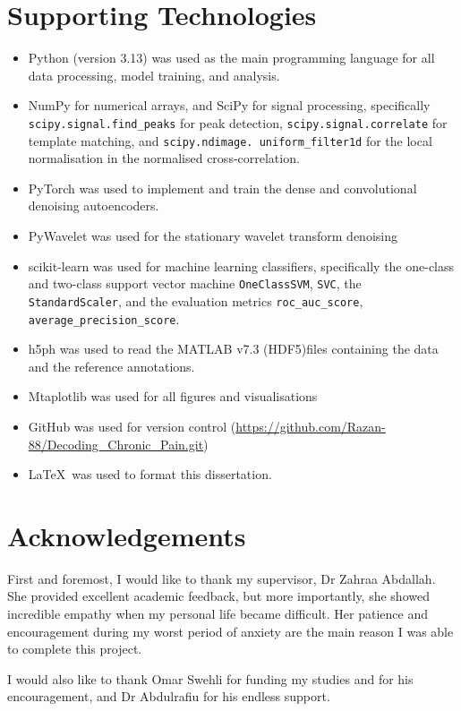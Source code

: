 \documentclass[ %
                    author={Rzan Alkabier},
                    supervisor={Dr. Zahraa Abdallah},
                    degree={MSc},
                     title={Denoising Extracellular Recording for Spike Detection and Classification on Single Channels},
                    subtitle={Does denoising improve detection and classification performance?},
                      type={},
                      year={2026}]{dissertation}
\begin{document}
\chapter*{Supporting Technologies}
\begin{itemize}
    \item Python (version 3.13) was used as the main programming language for all data processing, model training, and analysis. 
    \item NumPy for numerical arrays, and SciPy for signal processing, specifically \texttt{scipy.signal.find\_peaks} for peak detection, \texttt{scipy.signal.correlate} for template matching, and \texttt{scipy.ndimage. uniform\_filter1d} for the local normalisation in the normalised cross-correlation. 
    \item PyTorch was used to implement and train the dense and convolutional denoising autoencoders. 
    \item PyWavelet was used for the stationary wavelet transform denoising
    \item scikit-learn was used for machine learning classifiers, specifically the one-class and two-class support vector machine \texttt{OneClassSVM}, \texttt{SVC}, the \texttt{StandardScaler}, and the evaluation metrics \texttt{roc\_auc\_score}, \texttt{average\_precision\_score}. 
    \item h5ph was used to read the MATLAB v7.3 (HDF5)files containing the data and the reference annotations. 
    \item Mtaplotlib was used for all figures and visualisations
    \item GitHub was used for version control (\url{https://github.com/Razan-88/Decoding_Chronic_Pain.git})
    \item \LaTeX\ was used to format this dissertation.  
    
\end{itemize}
\chapter*{Acknowledgements}
First and foremost, I would like to thank my supervisor, Dr Zahraa Abdallah. She provided excellent academic feedback, but more importantly, she showed incredible empathy when my personal life became difficult. Her patience and encouragement during my worst period of anxiety are the main reason I was able to complete this project. 

\noindent
I would also like to thank Omar Swehli for funding my studies and for his encouragement, and Dr Abdulrafiu for his endless support. 
\end{document}

